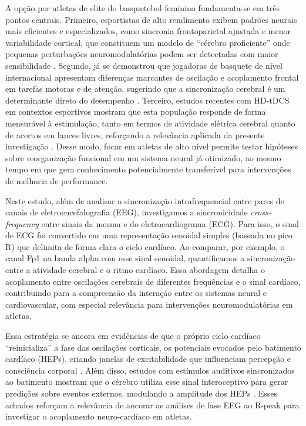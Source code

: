 A opção por atletas de elite do basquetebol feminino fundamenta-se em três pontos centrais. Primeiro, esportistas de alto rendimento exibem padrões neurais mais eficientes e especializados, como sincronia frontoparietal ajustada e menor variabilidade cortical, que constituem um modelo de ``cérebro proficiente'' onde pequenas perturbações neuromodulatórias podem ser detectadas com maior sensibilidade \cite{yarrow2009inside,bertollo2016proficient}. Segundo, já se demonstrou que jogadoras de basquete de nível internacional apresentam diferenças marcantes de oscilação e acoplamento frontal em tarefas motoras e de atenção, sugerindo que a sincronização cerebral é um determinante direto do desempenho \cite{chuang2013differences}. Terceiro, estudos recentes com HD-tDCS em contextos esportivos mostram que esta população responde de forma mensurável à estimulação, tanto em termos de atividade elétrica cerebral quanto de acertos em lances livres, reforçando a relevância aplicada da presente investigação \cite{moscaleski2022hdtdcs}. Desse modo, focar em atletas de alto nível permite testar hipóteses sobre reorganização funcional em um sistema neural já otimizado, ao mesmo tempo em que gera conhecimento potencialmente transferível para intervenções de melhoria de performance.

Neste estudo, além de analisar a sincronização intrafrequencial entre pares de canais de eletroencefalografia (EEG), investigamos a sincronicidade \textit{cross-frequency} entre sinais da mesma e do eletrocardiograma (ECG). Para isso, o sinal de ECG foi convertido em uma representação senoidal simples (baseada no pico R) que delimita de forma clara o ciclo cardíaco. Ao comparar, por exemplo, o canal Fp1 na banda alpha com esse sinal senoidal, quantificamos a sincronização entre a atividade cerebral e o ritmo cardíaco. Essa abordagem detalha o acoplamento entre oscilações cerebrais de diferentes frequências e o sinal cardíaco, contribuindo para a compreensão da interação entre os sistemas neural e cardiovascular, com especial relevância para intervenções neuromodulatórias em atletas.

Essa estratégia se ancora em evidências de que o próprio ciclo cardíaco “reinicializa” a fase das oscilações corticais, os potenciais evocados pelo batimento cardíaco (HEPs), criando janelas de excitabilidade que influenciam percepção e consciência corporal \cite{park2018neural}. Além disso, estudos com estímulos auditivos sincronizados ao batimento mostram que o cérebro utiliza esse sinal interoceptivo para gerar predições sobre eventos externos, modulando a amplitude dos HEPs 
\cite{banelli2020skipping}. Esses achados reforçam a relevância de ancorar as análises de fase EEG ao R-peak para investigar o acoplamento neuro-cardíaco em atletas.


